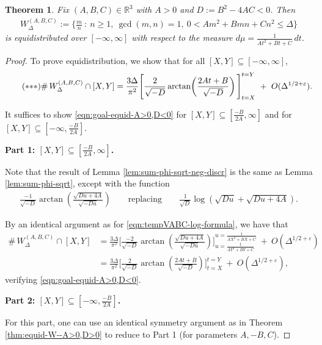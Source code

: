 \documentclass[11pt,letterpaper,reqno]{amsart}
\newtheorem{theorem}{Theorem}[section]
\numberwithin{equation}{section}
\numberwithin{figure}{section}
\numberwithin{table}{section}
\newcommand{\lrp}[1]{\left(#1\right)}
\newcommand{\RR}{\mathbb{R}}
\begin{document}
{
\renewcommand{\thetheorem}{\ref{thm:equid-WABC} (\(A>0,D<0\))}
\begin{theorem}  \label{thm:equid-W--A>0,D<0}
Fix $(A,B,C) \in \RR^3$ with $A > 0$ and $D := B^2-4AC < 0$. Then
\begin{align}
    W_{\Delta}^{(A,B,C)} := \Big\{\frac{m}{n} ~:~ n\ge 1,~ \gcd(m,n)=1,~   0 < A m^2 + B mn + C n^2  \le \Delta
    \Big\}
\end{align}
is equidistributed over  $[-\infty,\infty]$ 
with respect to the measure $d\mu = \frac{1}{At^2+Bt+C} \,dt$.
\end{theorem}
}
\begin{proof}
To prove equidistribution, we show that for all $[X,Y] \subseteq [-\infty,\infty]$,
\begin{align} \label{eqn:goal-equid-A>0,D<0} \tag{$*{*}*$}
    \#\, W_{\Delta}^{(A,B,C)} \cap [X,Y] = 
    \frac{3\Delta}{\pi^2}\Bigg[ 
        \frac{2}{\sqrt{-D}} \arctan\!\lrp{\frac{2At+B}{\sqrt{-D}}}
         \Bigg]_{t=X}^{t=Y} ~+~ O(\Delta^{1/2+\varepsilon}).
\end{align}



It suffices to show \eqref{eqn:goal-equid-A>0,D<0} for 
$[X,Y] \subseteq [\frac{-B}{2A},\infty]$ and for $[X,Y] \subseteq [-\infty,\frac{-B}{2A}]$.

\noindent
\textbf{Part 1: $[X,Y] \subseteq [\frac{-B}{2A}, \infty]$.}

Note that the result of Lemma \ref{lem:sum-phi-sqrt-neg-discr} is the same as Lemma \ref{lem:sum-phi-sqrt}, except with the function
\begin{align}
    \frac{-1}{\sqrt{-D}} \arctan\!\lrp{ \frac{\sqrt{Du+4A}}{\sqrt{-Du}}}
    \qquad \text{replacing} \qquad
    \frac{1}{\sqrt{D}} \log\lrp{
                \sqrt{Du} + \sqrt{Du+4A}
            }.
\end{align}

By an identical argument as for \eqref{eqn:tempVABC-log-formula}, we have that
\begin{align}
    \#\, W_{\Delta}^{(A,B,C)} \cap [X,Y] 
    &=\frac{3\Delta}{\pi^2}\Bigg[ 
            \frac{-2}{\sqrt{-D}} \arctan\lrp{\frac{\sqrt{Du+4A}}{\sqrt{-Du}}}
         \Bigg]_{u=\frac{1}{AY^2+BY+C}}^{u=\frac{1}{AX^2+BX+C}} ~+~ O(\Delta^{1/2+\varepsilon}) \\
    &=\frac{3\Delta}{\pi^2}\Bigg[ 
        \frac{2}{\sqrt{-D}} \arctan\lrp{\frac{2At+B}{\sqrt{-D}}}
         \Bigg]_{t=X}^{t=Y} ~+~ O(\Delta^{1/2+\varepsilon}),
\end{align}
verifying \eqref{eqn:goal-equid-A>0,D<0}.







\noindent
\textbf{Part 2: $[X,Y] \subseteq [-\infty, \frac{-B}{2A}]$. }

For this part, one can use an identical symmetry argument as in Theorem \ref{thm:equid-W--A>0,D>0} to reduce to Part 1 (for parameters $A,-B,C$).
\end{proof}
\end{document}
